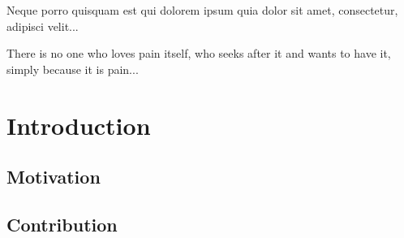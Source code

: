 \begin{savequote}[8cm]
\textlatin{Neque porro quisquam est qui dolorem ipsum quia dolor sit amet, consectetur, adipisci velit...}

There is no one who loves pain itself, who seeks after it and wants to have it, simply because it is pain...
\end{savequote}

\chapter{\label{ch:1-intro}Introduction} 

\minitoc

\section{Motivation}


%
%
%
%
%

\section{Contribution}



